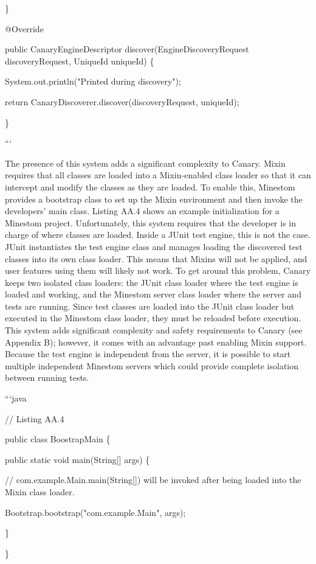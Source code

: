 \documentclass{article}
\begin{document}
\begin{onehalfspacing}
\}

@Override

public CanaryEngineDescriptor discover(EngineDiscoveryRequest
discoveryRequest, UniqueId uniqueId) \{

System.out.println("Printed during discovery");

return CanaryDiscoverer.discover(discoveryRequest, uniqueId);

\}

```

The presence of this system adds a significant complexity to Canary.
Mixin requires that all classes are loaded into a Mixin-enabled class
loader so that it can intercept and modify the classes as they are
loaded. To enable this, Minestom provides a bootstrap class to set up
the Mixin environment and then invoke the developers' main class.
Listing AA.4 shows an example initialization for a Minestom project.
Unfortunately, this system requires that the developer is in charge of
where classes are loaded. Inside a JUnit test engine, this is not the
case. JUnit instantiates the test engine class and manages loading the
discovered test classes into its own class loader. This means that
Mixins will not be applied, and user features using them will likely not
work. To get around this problem, Canary keeps two isolated class
loaders: the JUnit class loader where the test engine is loaded and
working, and the Minestom server class loader where the server and tests
are running. Since test classes are loaded into the JUnit class loader
but executed in the Minestom class loader, they must be reloaded before
execution. This system adds significant complexity and safety
requirements to Canary (see Appendix B); however, it comes with an
advantage past enabling Mixin support. Because the test engine is
independent from the server, it is possible to start multiple
independent Minestom servers which could provide complete isolation
between running tests.

```java

// Listing AA.4

public class BoostrapMain \{

public static void main(String{[}{]} args) \{

// com.example.Main.main(String{[}{]}) will be invoked after being
loaded into the Mixin class loader.

Bootstrap.bootstrap("com.example.Main", args);

\}

\}


\end{onehalfspacing}
\end{document}
